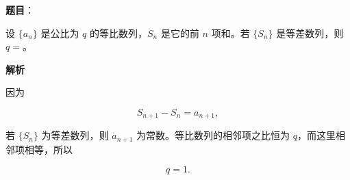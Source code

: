 \begin{answer}

\textbf{题目}：

设 $\{a_n\}$ 是公比为 $q$ 的等比数列，$S_n$ 是它的前 $n$ 项和。若 $\{S_n\}$ 是等差数列，则 $q=$\gkblank{}。

\textbf{解析}

因为

\nopagebreak[4]
\[
S_{n+1}-S_n=a_{n+1},
\]

若 $\{S_n\}$ 为等差数列，则 $a_{n+1}$ 为常数。等比数列的相邻项之比恒为 $q$，而这里相邻项相等，所以

\nopagebreak[4]
\[
q=1.
\]


\end{answer}

